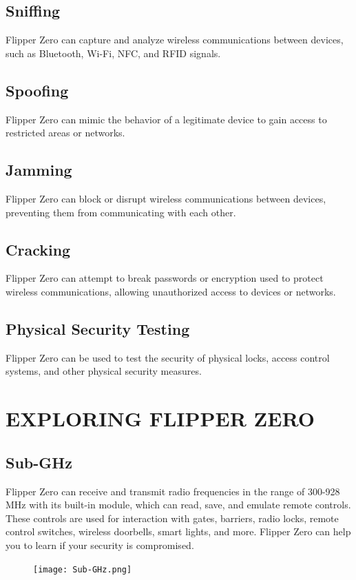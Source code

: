 \documentclass[a4paper,11pt]{report}
\begin{document}
\section{Sniffing}
Flipper Zero can capture and analyze wireless communications between devices, such as Bluetooth, Wi-Fi, NFC, and RFID signals.
\section{Spoofing}
Flipper Zero can mimic the behavior of a legitimate device to gain access to restricted areas or networks.
\section{Jamming}
Flipper Zero can block or disrupt wireless communications between devices, preventing them from communicating with each other.
\section{Cracking}
Flipper Zero can attempt to break passwords or encryption used to protect wireless communications, allowing unauthorized access to devices or networks.
\section{Physical Security Testing}
Flipper Zero can be used to test the security of physical locks, access control systems, and other physical security measures.
\chapter{EXPLORING FLIPPER ZERO}
\section{Sub-GHz}
Flipper Zero can receive and transmit radio frequencies in the range of 300-928 MHz with its built-in module, which can read, save, and emulate remote controls. These controls are used for interaction with gates, barriers, radio locks, remote control switches, wireless doorbells, smart lights, and more. Flipper Zero can help you to learn if your security is compromised.
\begin{figure}[h]
	\centering
	\hspace{21pt}
	\texttt{[image: Sub-GHz.png]}
	\label{fig:type.png}
\end{figure}
\end{document}
